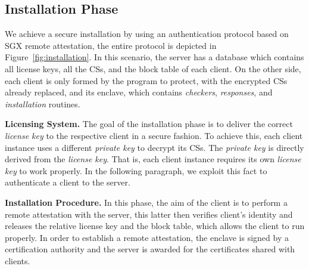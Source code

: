 \subsection{Installation Phase}

We achieve a secure installation by using an authentication protocol based on
SGX remote attestation, the entire protocol is depicted in 
Figure~\ref{fig:installation}.
In this scenario, the server has a database which contains all license keys,
all the CSs, and the block table of each client.
On the other side, each client is only formed by the program to protect, with 
the encrypted CSs already replaced, and its enclave,
which contains \emph{checkers}, \emph{responses}, and \emph{installation} 
routines.

\textbf{Licensing System.}
The goal of the installation phase is to deliver the correct \emph{license key} 
to the respective client in a secure fashion.
To achieve this, each client instance uses a different \emph{private key} to 
decrypt its CSs.
The \emph{private key} is directly derived from the \emph{license key}.
That is, each client instance requires its own \emph{license key} to work 
properly.
In the following paragraph, we exploit this fact to authenticate a client to 
the server.

\textbf{Installation Procedure.}
In this phase, the aim of the client is to perform a remote attestation with 
the server, this latter
then verifies client's identity and releases the relative license key and the 
block
table, which allows the client to run properly.
In order to establish a remote attestation, the enclave is signed by a 
certification authority
and the server is awarded for the certificates shared with clients.

